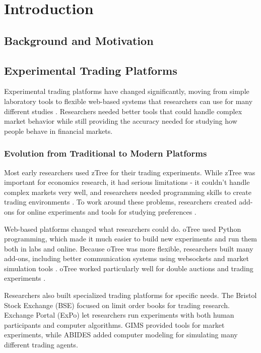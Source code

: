 \section{Introduction}

\subsection{Background and Motivation}

\subsection{Experimental Trading Platforms}

Experimental trading platforms have changed significantly, moving from simple laboratory tools to flexible web-based systems that researchers can use for many different studies \citep{Andraszewicz2023Zurich, Chen2016oTree, Cliff2018Open}. Researchers needed better tools that could handle complex market behavior while still providing the accuracy needed for studying how people behave in financial markets.

\subsubsection{Evolution from Traditional to Modern Platforms}

Most early researchers used zTree \citep{fischbacher2007z} for their trading experiments. While zTree was important for economics research, it had serious limitations - it couldn't handle complex markets very well, and researchers needed programming skills to create trading environments \citep{Fischbacher1999z}. To work around these problems, researchers created add-ons for online experiments \citep{Ertac2020z} and tools for studying preferences \citep{Fidanoski2022Z}.

Web-based platforms changed what researchers could do. oTree \citep{Chen2016oTree} used Python programming, which made it much easier to build new experiments and run them both in labs and online. Because oTree was more flexible, researchers built many add-ons, including better communication systems using websockets \citep{Crede2019Otree, Washinyira2023Integrating} and market simulation tools \citep{Grant2020oTree}. oTree worked particularly well for double auctions and trading experiments \citep{Aldrich2019oTree}.

Researchers also built specialized trading platforms for specific needs. The Bristol Stock Exchange (BSE) \citep{Cliff2018Open} focused on limit order books for trading research. Exchange Portal (ExPo) \citep{Stotter2014Behavioural} let researchers run experiments with both human participants and computer algorithms. GIMS \citep{Palan2015GIMSSoftware} provided tools for market experiments, while ABIDES \citep{Shi2023Neural} added computer modeling for simulating many different trading agents.

